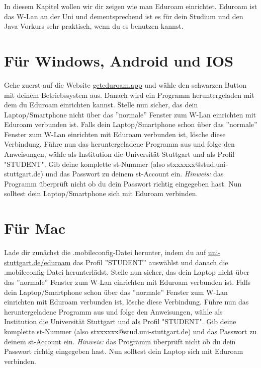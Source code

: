 

In diesem Kapitel wollen wir dir zeigen wie man Eduroam einrichtet. Eduroam ist das W-Lan an der Uni und dementsprechend ist es für dein Studium und den Java Vorkurs sehr praktisch, wenn du es benutzen kannst.
 
\section*{Für Windows, Android und IOS}
Gehe zuerst auf die Website \href{\eduroamurl}{geteduroam.app} und wähle den schwarzen Button mit deinem Betriebssystem aus. Danach wird ein Programm heruntergeladen mit dem du Eduroam einrichten kannst.\newline
Stelle nun sicher, das dein Laptop/Smartphone nicht über das ''normale'' Fenster zum W-Lan einrichten mit Eduroam verbunden ist. Falls dein Laptop/Smartphone schon über das ''normale'' Fenster zum W-Lan einrichten mit Eduroam verbunden ist, lösche diese Verbindung.\newline
Führe nun das heruntergeladene Programm aus und folge den Anweisungen, wähle als Institution die Universität Stuttgart und als Profil "STUDENT". Gib deine komplette st-Nummer (also stxxxxxx@stud.uni-stuttgart.de) und das Passwort zu deinem st-Account ein.\newline
\textit{Hinweis:} das Programm überprüft nicht ob du dein Passwort richtig eingegeben hast.\newline
Nun solltest dein Laptop/Smartphone sich mit Eduroam verbinden.\newline

\section*{Für Mac}
Lade dir zunächst die .mobileconfig-Datei herunter, indem du auf \href{\eduroamurllinux}{uni-stuttgart.de/eduroam} das Profil ''STUDENT'' auswählst und danach die .mobileconfig-Datei herunterlädst.\newline
Stelle nun sicher, das dein Laptop nicht über das ''normale'' Fenster zum W-Lan einrichten mit Eduroam verbunden ist. Falls dein Laptop/Smartphone schon über das ''normale'' Fenster zum W-Lan einrichten mit Eduroam verbunden ist, lösche diese Verbindung.\newline
Führe nun das heruntergeladene Programm aus und folge den Anweisungen, wähle als Institution die Universität Stuttgart und als Profil "STUDENT". Gib deine komplette st-Nummer (also stxxxxxx@stud.uni-stuttgart.de) und das Passwort zu deinem st-Account ein.\newline
\textit{Hinweis:} das Programm überprüft nicht ob du dein Passwort richtig eingegeben hast.\newline
Nun solltest dein Laptop sich mit Eduroam verbinden.\newline


